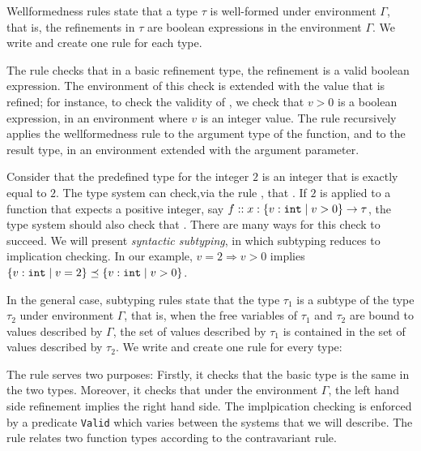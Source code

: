 Wellformedness rules  
state that a type $\tau$ is well-formed under environment
$\Gamma$, that is, the refinements in $\tau$ are boolean 
expressions in the environment $\Gamma$.
%
We write \isWellFormed{\Gamma}{\tau} and create one rule for each type.

The rule \wtBase checks that in a basic refinement type,  
the refinement is a valid boolean expression.
The environment of this check is extended with the value that is refined;
for instance, to check the validity of , 
we check that $v > 0$ is a boolean expression, in an 
environment where $v$ is an integer value.
%
The rule \wtFun recursively applies the wellformedness rule to
the argument type of the function, and to the result type, 
in an environment extended with the argument parameter.

Consider that the predefined type for the integer $2$
is an integer that is exactly equal to $2$.
The type system can check,via the rule \tconst , that 
.
If $2$ is applied to a function that expects a
positive integer, say $f::{x:\left\lbrace v : \texttt{int}\mid v>0\right\rbrace} \rightarrow \tau$,
the type system should also check that 
.
%
There are many ways for this check to succeed.
We will present \textit{syntactic subtyping},
in which subtyping reduces to implication checking.
In our example, $v = 2 \Rightarrow v > 0 $ implies 
$\left\lbrace v : \texttt{int}\mid v=2\right\rbrace \preceq \left\lbrace v : \texttt{int}\mid v>0\right\rbrace$.


In the general case, subtyping rules
state that the type $\tau_1$ is a subtype of the type
$\tau_2$ under environment $\Gamma$, that is, when the free variables
of $\tau_1$ and $\tau_2$
are bound to values described by $\Gamma$, the set of values described
by $\tau_1$ is contained in the set of values described by $\tau_2$. 
We write  and create one rule for every type:

The rule \tsubBase serves two purposes:
Firstly,
it checks that the basic type is the same in the two types.
Moreover, it checks that under the environment $\Gamma$, 
the left hand side refinement implies the right hand side.
The implpication checking is enforced by a predicate \texttt{Valid} 
which varies between the systems that we will describe.
%
The rule \tsubFun relates two function types according to the contravariant rule.


